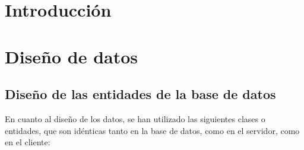 
\section{Introducción}

\section{Diseño de datos}
\subsection{Diseño de las entidades de la base de datos}
En cuanto al diseño de los datos, se han utilizado las siguientes clases o entidades, que son idénticas tanto en la base de datos, como en el servidor, como en el cliente:
